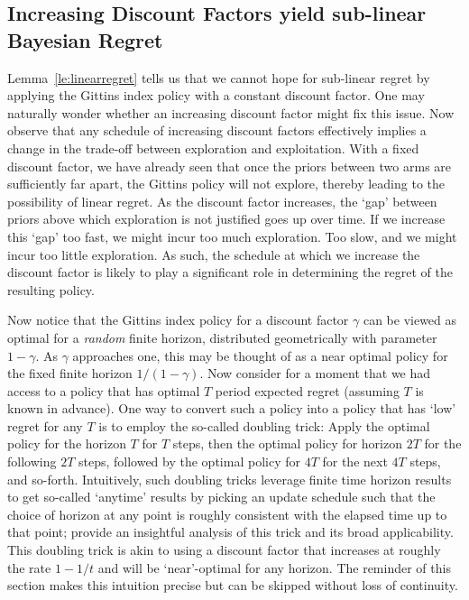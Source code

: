 \subsection{Increasing Discount Factors yield sub-linear Bayesian Regret}

Lemma~\ref{le:linearregret} tells us that we cannot hope for sub-linear regret by applying the Gittins index policy with a constant discount factor. One may naturally wonder whether an increasing discount factor might fix this issue. Now observe that any schedule of increasing discount factors effectively implies a change in the trade-off between exploration and exploitation. With a fixed discount factor, we have already seen that once the priors between two arms are sufficiently far apart, the Gittins policy will not explore, thereby leading to the possibility of linear regret. As the discount factor increases, the `gap' between priors above which exploration is not justified goes up over time. If we increase this `gap' too fast, we might incur too much exploration. Too slow, and we might incur too little exploration. As such, the schedule at which we increase the discount factor is likely to play a significant role in determining the regret of the resulting policy. 

Now notice that the Gittins index policy for a discount factor $\gamma$ can be viewed as optimal for a {\em random} finite horizon, distributed geometrically with parameter $1-\gamma$. As $\gamma$ approaches one, this may be thought of as a near optimal policy for the fixed finite horizon $1/(1-\gamma)$. Now consider for a moment that we had access to a policy that has optimal $T$ period expected regret (assuming $T$ is known in advance). One way to convert such a policy into a policy that has `low' regret for any $T$ is to employ the so-called doubling trick: Apply the optimal policy for the horizon $T$ for $T$ steps, then the optimal policy for horizon $2T$ for the following $2T$ steps, followed by the optimal policy for $4T$ for the next $4T$ steps, and so-forth. Intuitively, such doubling tricks leverage finite time horizon results to get so-called `anytime' results by picking an update schedule such that the choice of horizon at any point is roughly consistent with the elapsed time up to that point; \cite{besson2018doubling} provide an insightful analysis of this trick and its broad applicability. This doubling trick is akin to using a discount factor that increases at roughly the rate $1 - 1/t$ and will be `near'-optimal for any horizon. {\color{blue} The reminder of this section makes this intuition precise but can be skipped without loss of continuity.} 

